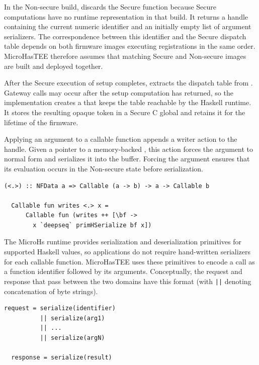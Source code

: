 \documentclass[sigconf]{acmart}
\begin{document}
In the Non-secure build,  discards the Secure function because Secure computations have no runtime representation in that build.
It returns a handle containing the current numeric identifier and an initially empty list of argument serializers.
The correspondence between this identifier and the Secure dispatch table depends on both firmware images executing registrations in the same order.
MicroHasTEE therefore assumes that matching Secure and Non-secure images are built and deployed together.

After the Secure execution of setup completes,  extracts the dispatch table from .
Gateway calls may occur after the setup computation has returned, so the implementation creates a  that keeps the table reachable by the Haskell runtime.
It stores the resulting opaque token in a Secure C global and retains it for the lifetime of the firmware.

Applying an argument to a callable function appends a writer action to the handle.
Given a pointer to a memory-backed , this action forces the argument to normal form and serializes it into the buffer.
Forcing the argument ensures that its evaluation occurs in the Non-secure state before serialization.

\begin{lstlisting}[style=haskell]
  (<.>) :: NFData a => Callable (a -> b) -> a -> Callable b

  Callable fun writes <.> x =
      Callable fun (writes ++ [\bf ->
        x `deepseq` primHSerialize bf x])
\end{lstlisting}

The MicroHs runtime provides serialization and deserialization primitives for supported Haskell values, so applications do not require hand-written serializers for each callable function.
MicroHasTEE uses these primitives to encode a call as a function identifier followed by its arguments.
Conceptually, the request and response that pass between the two domains have this format (with \texttt{||} denoting concatenation of byte strings).

\begin{lstlisting}[basicstyle=\small\ttfamily]
  request = serialize(identifier)
          || serialize(arg1)
          || ...
          || serialize(argN)

  response = serialize(result)
\end{lstlisting}
\end{document}
